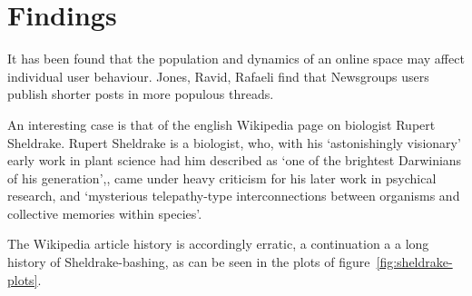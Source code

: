 \section{Findings}

It has been found that the population and dynamics of an online space
may affect individual user behaviour. Jones, Ravid, Rafaeli find that
Newsgroups users publish shorter posts in more populous threads.  

An interesting case is that of the english Wikipedia page on biologist
Rupert Sheldrake. Rupert Sheldrake is a biologist, who, with his
`astonishingly visionary' early work in plant science had him
described as `one of the brightest Darwinians of his
generation',\cite{odyssey-auxin}\cite{guardianshel}, came under heavy
criticism for his later work in psychical research, and `mysterious
telepathy-type interconnections between organisms and collective
memories within species'.\cite{sheldrake-biog} 

The Wikipedia article history is accordingly erratic, a continuation a
a long history of Sheldrake-bashing, as can be seen in the plots of
figure~\ref{fig:sheldrake-plots}.


